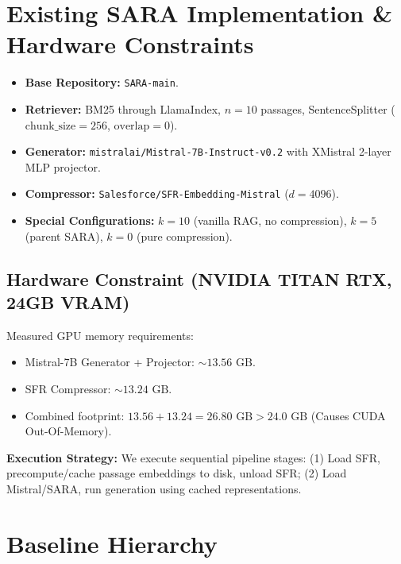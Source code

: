 \documentclass[11pt,a4paper]{article}
\begin{document}
\section{Existing SARA Implementation \& Hardware Constraints}
\begin{itemize}
    \item \textbf{Base Repository:} \texttt{SARA-main}.
    \item \textbf{Retriever:} BM25 through LlamaIndex, $n=10$ passages, SentenceSplitter ($\text{chunk\_size}=256$, $\text{overlap}=0$).
    \item \textbf{Generator:} \texttt{mistralai/Mistral-7B-Instruct-v0.2} with XMistral 2-layer MLP projector.
    \item \textbf{Compressor:} \texttt{Salesforce/SFR-Embedding-Mistral} ($d=4096$).
    \item \textbf{Special Configurations:} $k=10$ (vanilla RAG, no compression), $k=5$ (parent SARA), $k=0$ (pure compression).
\end{itemize}

\subsection{Hardware Constraint (NVIDIA TITAN RTX, 24GB VRAM)}
Measured GPU memory requirements:
\begin{itemize}
    \item Mistral-7B Generator + Projector: $\sim 13.56\text{ GB}$.
    \item SFR Compressor: $\sim 13.24\text{ GB}$.
    \item Combined footprint: $13.56 + 13.24 = 26.80\text{ GB} > 24.0\text{ GB}$ (Causes CUDA Out-Of-Memory).
\end{itemize}
\textbf{Execution Strategy:} We execute sequential pipeline stages: (1) Load SFR, precompute/cache passage embeddings to disk, unload SFR; (2) Load Mistral/SARA, run generation using cached representations.

\section{Baseline Hierarchy}
\end{document}
